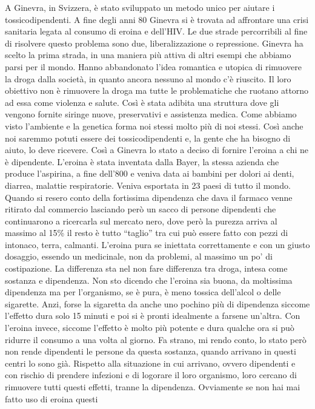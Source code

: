 \documentclass[12pt]{book} %
\begin{document}
\begin{mdframed}[linewidth=1pt]
A Ginevra, in Svizzera, è stato sviluppato un metodo unico per aiutare i tossicodipendenti. A fine degli anni 80 Ginevra
si è trovata ad affrontare una crisi sanitaria legata al consumo di eroina e dell'HIV. Le due
strade percorribili al fine di risolvere questo problema sono due, liberalizzazione o repressione. Ginevra ha scelto la
prima strada, in una maniera più attiva di altri esempi che abbiamo parsi per il mondo. Hanno abbandonato
l'idea romantica e utopica di rimuovere la droga dalla società, in quanto ancora nessuno al mondo
c'è riuscito. Il loro obiettivo non è rimuovere la droga ma tutte le problematiche che ruotano
attorno ad essa come violenza e salute. Così è stata adibita una struttura dove gli vengono fornite siringe nuove,
preservativi e assistenza medica. Come abbiamo visto l'ambiente e la genetica forma noi stessi
molto più di noi stessi. Così anche noi saremmo potuti essere dei tossicodipendenti e, la gente che ha bisogno di
aiuto, lo deve ricevere. Così a Ginevra lo stato a deciso di fornire l'eroina a chi ne è
dipendente. L'eroina è stata inventata dalla Bayer, la stessa azienda che produce
l'aspirina, a fine dell'800 e veniva data ai bambini per dolori ai denti,
diarrea, malattie respiratorie. Veniva esportata in 23 paesi di tutto il mondo. Quando si resero conto della fortissima
dipendenza che dava il farmaco venne ritirato dal commercio lasciando però un sacco di persone dipendenti che
continuarono a ricercarla sul mercato nero, dove però la purezza arriva al massimo al 15\% il resto è tutto “taglio”
tra cui può essere fatto con pezzi di intonaco, terra, calmanti. L'eroina pura se iniettata
correttamente e con un giusto dosaggio, essendo un medicinale, non da problemi, al massimo un po' di costipazione. La
differenza sta nel non fare differenza tra droga, intesa come sostanza e dipendenza. Non sto dicendo che
l'eroina sia buona, da moltissima dipendenza ma per l'organismo, se è pura, è
meno tossica dell'alcol o delle sigarette. Anzi, forse la sigaretta da anche uno pochino più di
dipendenza siccome l'effetto dura solo 15 minuti e poi si è pronti idealmente a farsene
un'altra. Con l'eroina invece, siccome l'effetto è molto
più potente e dura qualche ora si può ridurre il consumo a una volta al giorno. Fa strano, mi rendo conto, lo stato
però non rende dipendenti le persone da questa sostanza, quando arrivano in questi centri lo sono già. Rispetto alla
situazione in cui arrivano, ovvero dipendenti e con rischio di prendere infezioni e di logorare il loro organismo, loro
cercano di rimuovere tutti questi effetti, tranne la dipendenza. Ovviamente se non hai mai fatto uso di eroina questi

\end{mdframed}
\end{document}
